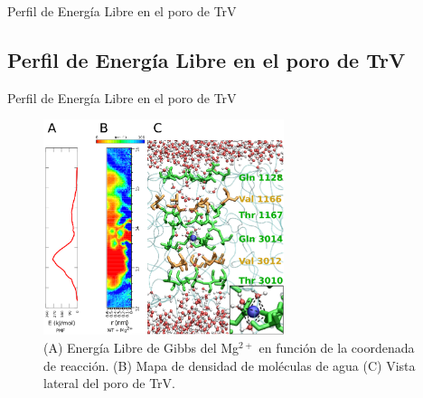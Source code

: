 \documentclass[8pt]{beamer}
\begin{document}
\begin{frame}[t]{Perfil de Energía Libre en el poro de TrV}
\end{frame}

\subsection{Perfil de Energía Libre en el poro de TrV}
\begin{frame}{Perfil de Energía Libre en el poro de TrV}
\begin{figure}[ht]
  \centering
  \includegraphics[height=6.3cm,keepaspectratio]{Figure/TrV_Mg_Dens.png}
\caption*{(A) Energía Libre de Gibbs del Mg$^{2+}$ en función de la coordenada de reacción. (B) Mapa de densidad de moléculas de agua (C) Vista lateral del poro de TrV.} %
\end{figure}
\end{frame}
\end{document}
